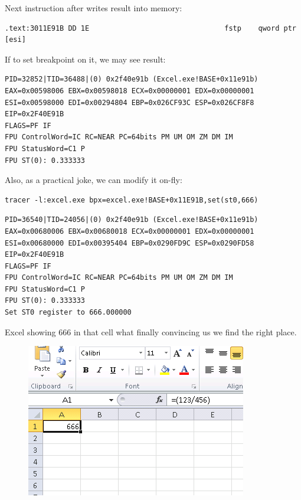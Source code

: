 {Next instruction after \FDIV writes result into memory:}

\begin{lstlisting}
.text:3011E91B DD 1E                                fstp    qword ptr [esi]
\end{lstlisting}

{If to set breakpoint on it, we may see result:}

\begin{lstlisting}
PID=32852|TID=36488|(0) 0x2f40e91b (Excel.exe!BASE+0x11e91b)
EAX=0x00598006 EBX=0x00598018 ECX=0x00000001 EDX=0x00000001
ESI=0x00598000 EDI=0x00294804 EBP=0x026CF93C ESP=0x026CF8F8
EIP=0x2F40E91B
FLAGS=PF IF
FPU ControlWord=IC RC=NEAR PC=64bits PM UM OM ZM DM IM 
FPU StatusWord=C1 P 
FPU ST(0): 0.333333
\end{lstlisting}

{Also, as a practical joke, we can modify it on-fly:}

\begin{lstlisting}
tracer -l:excel.exe bpx=excel.exe!BASE+0x11E91B,set(st0,666)
\end{lstlisting}

\begin{lstlisting}
PID=36540|TID=24056|(0) 0x2f40e91b (Excel.exe!BASE+0x11e91b)
EAX=0x00680006 EBX=0x00680018 ECX=0x00000001 EDX=0x00000001
ESI=0x00680000 EDI=0x00395404 EBP=0x0290FD9C ESP=0x0290FD58
EIP=0x2F40E91B
FLAGS=PF IF
FPU ControlWord=IC RC=NEAR PC=64bits PM UM OM ZM DM IM 
FPU StatusWord=C1 P 
FPU ST(0): 0.333333
Set ST0 register to 666.000000
\end{lstlisting}

{Excel showing $666$ in that cell what finally convincing us we find the right place.}

\begin{figure}[ht!]
\centering
\includegraphics[scale=0.66]{digging_into_code/Excel_prank.png}
\caption{}
\end{figure}

